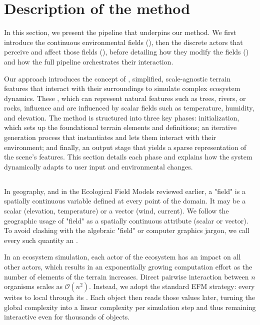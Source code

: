 \section{Description of the method}
\label{sec:env-obj-pipeline}

In this section, we present the pipeline that underpins our method.
We first introduce the continuous environmental fields (), then the discrete actors that perceive and affect those fields (), before detailing how they modify the fields () and how the full pipeline orchestrates their interaction.

Our approach introduces the concept of , simplified, scale-agnostic terrain features that interact with their surroundings to simulate complex ecosystem dynamics. These , which can represent natural features such as trees, rivers, or rocks, influence and are influenced by scalar fields such as temperature, humidity, and elevation. The method is structured into three key phases: initialization, which sets up the foundational terrain elements and  definitions; an iterative generation process that instantiates  and lets them interact with their environment; and finally, an output stage that yields a sparse representation of the scene's features. This section details each phase and explains how the system dynamically adapts to user input and environmental changes.

\subsection{}
\label{sec:env-obj-communication}

In geography, and in the Ecological Field Models reviewed earlier, a "field" is a spatially continuous variable defined at every point of the domain.
It may be a scalar (elevation, temperature) or a vector (wind, current). We follow the geographic usage of "field" as a spatially continuous attribute (scalar or vector). To avoid clashing with the algebraic "field" or computer graphics jargon, we call every such quantity an .

In an ecosystem simulation, each actor of the ecosystem has an impact on all other actors, which results in an exponentially growing computation effort as the number of elements of the terrain increases. Direct pairwise interaction between $n$ organisms scales as $\mathcal{O}(n^{2})$.
Instead, we adopt the standard EFM strategy: every  writes to local  through its .
Each object then reads those values later, turning the global complexity into a linear complexity per simulation step and thus remaining interactive even for thousands of objects.

